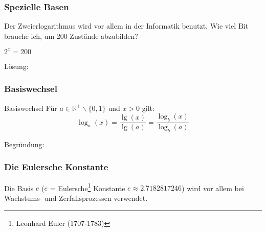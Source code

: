 \newpage



\subsubsection{Spezielle Basen}
Der Zweierlogarithmus wird vor allem in der Informatik benutzt. Wie viel Bit brauche ich, um 200 Zustände abzubilden?

$2^x = 200$

Lösung:




\subsubsection{Basiswechsel}
\begin{gesetz}{Basiswechsel}{}
  Für $a\in\mathbb{R}^{+}\backslash\{0,1\}$ und $x>0$ gilt:
  $$\log_a(x) = \frac{\lg(x)}{\lg(a)} = \frac{\log_b(x)}{\log_b(a)}$$
\end{gesetz}

Begründung:

\newpage


\subsubsection{Die Eulersche Konstante}

Die Basis $e$ ($e$ = Eulersche\footnote{Leonhard Euler (1707-1783)} Konstante $e\approx 2.7182817246$) wird vor allem bei Wachstums- und Zerfallsprozessen verwendet.

